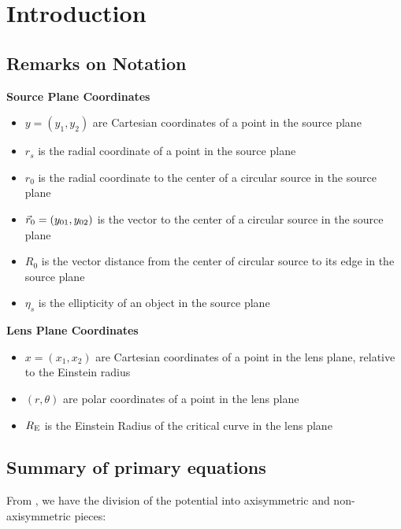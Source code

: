 \chapter{Introduction}

\section{Remarks on Notation}

{\bf Source Plane Coordinates}
\begin{itemize}
\item{ $ y = (y_1, y_2) $ are Cartesian coordinates of a point in the source plane}
\item{   $r_s $ is the radial coordinate of a point in the source plane}
\item{   $r_0 $ is the radial coordinate to the center of a circular source in the source plane}

\item{   $\vec{r}_0 =(y_{01},y_{02})$ is the vector to the center of a circular source in the source plane}

\item{ $R_0 $ is the vector distance from the center of circular
  source to its edge in the source plane}

\item{ $\eta_s$ is the ellipticity of an object in the source plane}

\end{itemize}

{\bf Lens Plane Coordinates}

\begin{itemize}
\item{ $ x = (x_1, x_2) $ are Cartesian coordinates of a point in the lens plane, relative to the Einstein radius}
\item{ $  (r, \theta) $ are polar coordinates of a point in the lens plane}
\item{ $R_{\mathrm{E}}$ is the Einstein Radius of the critical curve in the lens plane}
\end{itemize}



\section{Summary of primary equations}

From , we have the division of the potential into
axisymmetric and non-axisymmetric pieces:

